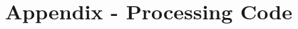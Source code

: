 \chapter{Appendix - Processing Code}

\lstset{language=Java}
\begin{lstlisting}[caption = {}, label={lst:Java}]

\end{lstlisting}